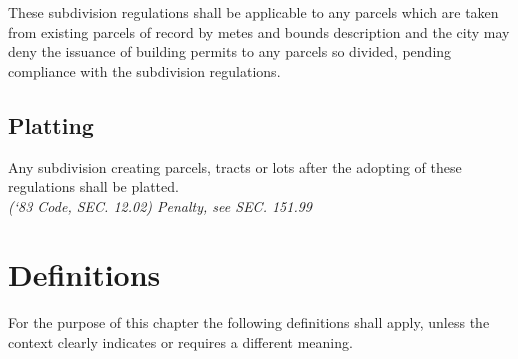 \subsubsection{}
These subdivision regulations shall be applicable to any parcels which are taken from existing parcels of record by metes and bounds description and the city may deny the issuance of building permits to any parcels so divided, pending compliance with the subdivision regulations.
\subsection{Platting}
Any subdivision creating parcels, tracts or lots after the adopting of these regulations shall be platted.\\
\emph{(‘83 Code, SEC. 12.02)  Penalty, see SEC. 151.99}
\section{Definitions}
For the purpose of this chapter the following definitions shall apply, unless the context clearly indicates or requires a different meaning.
